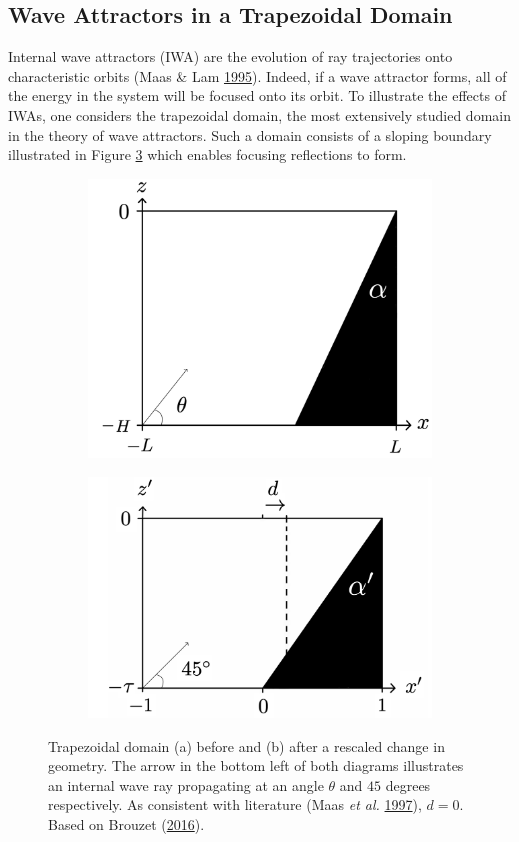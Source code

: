 \documentclass[a4paper]{article}
\numberwithin{equation}{section}
\begin{document}
\subsection{Wave Attractors in a Trapezoidal Domain}
Internal wave attractors (IWA) are the evolution of ray trajectories onto characteristic orbits (Maas \& Lam \hyperlink{ref 17}{1995}). Indeed, if a wave attractor forms, all of the energy in the system will be focused onto its orbit. To illustrate the effects of IWAs, one considers the trapezoidal domain, the most extensively studied domain in the theory of wave attractors. Such a domain consists of a sloping boundary illustrated in Figure \ref{fig:4} which enables focusing reflections to form.
\begin{figure}[h!]
\centering
\begin{subfigure}[t]{.5\textwidth}
  \centering
  \includegraphics[width=0.7\linewidth]{Images/left2}
  \label{fig:4a}
  \caption{}
\end{subfigure}%
\begin{subfigure}[t]{.5\textwidth}
  \centering
  \includegraphics[width=0.7\linewidth]{Images/right2}
  \label{fig:4b}
    \caption{}
\end{subfigure}
\caption{Trapezoidal domain (a) before and (b) after a rescaled change in geometry. The arrow in the bottom left of both diagrams illustrates an internal wave ray propagating at an angle $\theta$ and $45$ degrees respectively. As consistent with literature (Maas \emph{et al.} \protect\hyperlink{ref 11}{1997}), $d=0$. Based on Brouzet (\protect\hyperlink{ref 9}{2016}).}
  \label{fig:4}
\end{figure} \\
\end{document}
